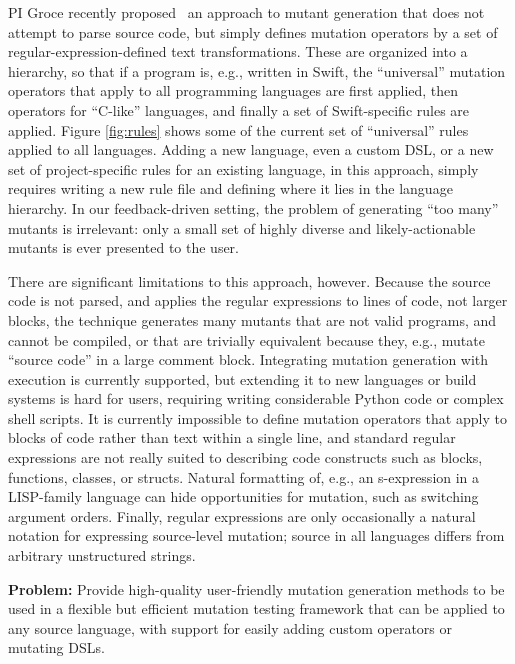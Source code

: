 PI Groce recently proposed~\cite{regexpMut} an approach to mutant generation that does not attempt to parse source code, but simply defines mutation operators by a set of regular-expression-defined text transformations.  These are organized into a hierarchy, so that if a program is, e.g., written in Swift, the ``universal'' mutation operators that apply to all programming languages are first applied, then operators for ``C-like'' languages, and finally a set of Swift-specific rules are applied.  Figure \ref{fig:rules} shows some of the current set of ``universal'' rules applied to all languages.  Adding a new language, even a custom DSL, or a new set of project-specific rules for an existing language, in this approach, simply requires writing a new rule file and defining where it lies in the language hierarchy.  In our feedback-driven setting, the problem of generating ``too many'' mutants is irrelevant: only a small set of highly diverse and likely-actionable mutants is ever presented to the user. %

There are significant limitations to this approach, however.  Because the source code is not parsed, and applies the regular expressions to lines of code, not larger blocks, the technique generates many mutants that are not valid programs, and cannot be compiled, or that are trivially equivalent because they, e.g., mutate ``source code'' in a large comment block.  Integrating mutation generation with execution is currently supported, but extending it to new languages or build systems is hard for users, requiring writing considerable Python code or complex shell scripts.  It is currently impossible to define mutation operators that apply to blocks of code rather than text within a single line, and standard regular expressions are not really suited to describing code constructs such as blocks, functions, classes, or structs.  Natural formatting of, e.g., an s-expression in a LISP-family language can hide opportunities for mutation, such as switching argument orders.  Finally, regular expressions are only occasionally a natural notation for expressing source-level mutation; source in all languages differs from arbitrary unstructured strings.

\begin{framed}
{\bf Problem:}  Provide high-quality user-friendly mutation generation methods to be used in a flexible but efficient mutation testing framework that can be applied to any source language, with support for easily adding custom operators or mutating DSLs.
\end{framed}

